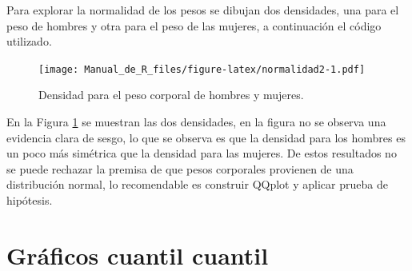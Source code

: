 \documentclass[10pt,]{krantz}
\makeatletter
\newenvironment{Shaded}{\begin{snugshade}}{\end{snugshade}}
\newcommand{\KeywordTok}[1]{\textcolor[rgb]{0.13,0.29,0.53}{\textbf{{#1}}}}
\newcommand{\DataTypeTok}[1]{\textcolor[rgb]{0.13,0.29,0.53}{{#1}}}
\newcommand{\DecValTok}[1]{\textcolor[rgb]{0.00,0.00,0.81}{{#1}}}
\newcommand{\StringTok}[1]{\textcolor[rgb]{0.31,0.60,0.02}{{#1}}}
\newcommand{\NormalTok}[1]{{#1}}
\newenvironment{kframe}{%
\medskip{}
\setlength{\fboxsep}{.8em}
 \def\at@end@of@kframe{}%
 \ifinner\ifhmode%
  \def\at@end@of@kframe{\end{minipage}}%
  \begin{minipage}{\columnwidth}%
 \fi\fi%
 \def\FrameCommand##1{\hskip\@totalleftmargin \hskip-\fboxsep
 \colorbox{shadecolor}{##1}\hskip-\fboxsep
     \hskip-\linewidth \hskip-\@totalleftmargin \hskip\columnwidth}%
 \MakeFramed {\advance\hsize-\width
   \@totalleftmargin\z@ \linewidth\hsize
   \@setminipage}}%
 {\par\unskip\endMakeFramed%
 \at@end@of@kframe}
\renewenvironment{Shaded}{\begin{kframe}}{\end{kframe}}
\makeatother
\begin{document}
Para explorar la normalidad de los pesos se dibujan dos densidades, una
para el peso de hombres y otra para el peso de las mujeres, a
continuación el código utilizado.

\begin{Shaded}
\end{Shaded}

\begin{figure}[htbp]
\centering
\texttt{[image: Manual\_de\_R\_files/figure-latex/normalidad2-1.pdf]}
\caption{\label{fig:normalidad2}Densidad para el peso corporal de hombres y
mujeres.}
\end{figure}

En la Figura \ref{fig:normalidad2} se muestran las dos densidades, en la
figura no se observa una evidencia clara de sesgo, lo que se observa es
que la densidad para los hombres es un poco más simétrica que la
densidad para las mujeres. De estos resultados no se puede rechazar la
premisa de que pesos corporales provienen de una distribución normal, lo
recomendable es construir QQplot y aplicar prueba de hipótesis.

\section{\texorpdfstring{Gráficos cuantil cuantil 
}{Gráficos cuantil cuantil   }}\label{graficos-cuantil-cuantil}
\end{document}
